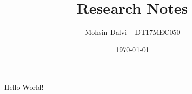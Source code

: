 \documentclass[runningheads, 11pt]{article}
\begin{document}
	
\title{Research Notes}
\author{Mohsin Dalvi -- DT17MEC050}
\date{\today}
\maketitle


	
Hello World! \cite{lentin2019}

%



\end{document}
